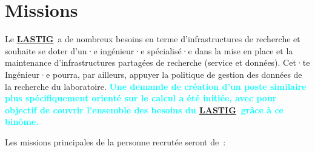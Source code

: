 \documentclass[10pt,a4paper,french]{article}
\newcommand{\LASTIG}{\href{https://www.umr-lastig.fr/}{\bf LASTIG}}
\newcommand{\IGN}{\href{https://ign.fr/}{\bf IGN}}
\newcommand{\UnivGustaveEiffel}{\href{https://www.univ-gustave-eiffel.fr/}{\bf Université Gustave Eiffel}}
\newcommand{\ACTE}{\href{https://www.umr-lastig.fr/acte/}{ACTE}}
\newcommand{\GEOVIS}{\href{https://www.umr-lastig.fr/geovis/}{GEOVIS}}
\newcommand{\MEIG}{\href{https://www.umr-lastig.fr/meig/}{MEIG}}
\newcommand{\STRUDEL}{\href{https://www.umr-lastig.fr/strudel/}{STRUDEL}}
\begin{document}

\section*{Missions}

Le \LASTIG~a de nombreux besoins en terme d'infrastructures de recherche et souhaite se doter d'un·e ingénieur·e spécialisé·e dans la mise en place et la maintenance d'infrastructures partagées de recherche (service et données).
Cet·te Ingénieur·e pourra, par ailleurs, appuyer la politique de gestion des données de la recherche du laboratoire.
\textcolor{cyan}{\bf{Une demande de création d'un poste similaire plus spécifiquement orienté sur le calcul a été initiée, avec pour objectif de couvrir l'ensemble des besoins du \LASTIG~grâce à ce binôme. }}

\medskip
Les missions principales de la personne recrutée seront de~:
\end{document}
